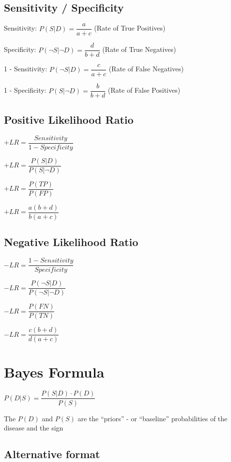 \documentclass[
]{book}
\begin{document}
\hypertarget{sensitivity-specificity}{%
\subsection{Sensitivity / Specificity}\label{sensitivity-specificity}}

Sensitivity: \(P(S|D)=\dfrac{a}{a+c}\) (Rate of True Positives)

Specificity: \(P(\neg S|\neg D)=\dfrac{d}{b+d}\) (Rate of True Negatives)

1 - Sensitivity: \(P(\neg S|D)=\dfrac{c}{a+c}\) (Rate of False Negatives)

1 - Specificity: \(P(S|\neg D)=\dfrac{b}{b+d}\) (Rate of False Positives)

\hypertarget{positive-likelihood-ratio}{%
\subsection{Positive Likelihood Ratio}\label{positive-likelihood-ratio}}

\(+LR=\dfrac{Sensitivity}{1-Specificity}\)

\(+LR=\dfrac{P(S|D)}{P(S|\neg D)}\)

\(+LR= \dfrac{P(TP)}{P(FP)}\)

\(+LR= \dfrac{a(b+d)}{b(a+c)}\)

\hypertarget{negative-likelihood-ratio}{%
\subsection{Negative Likelihood Ratio}\label{negative-likelihood-ratio}}

\(-LR=\dfrac{1-Sensitivity}{Specificity}\)

\(-LR=\dfrac{P(\neg S|D)}{P(\neg S|\neg D)}\)

\(-LR= \dfrac{P(FN)}{P(TN)}\)

\(-LR= \dfrac{c(b+d)}{d(a+c)}\)

\hypertarget{bayes-formula}{%
\section{Bayes Formula}\label{bayes-formula}}

\(P(D|S)=\dfrac{P(S|D)\cdot P(D)}{P(S)}\)

The \(P(D)\) and \(P(S)\) are the ``priors'' - or ``baseline'' probabilities of the disease and the sign

\hypertarget{alternative-format}{%
\subsection{Alternative format}\label{alternative-format}}
\end{document}

